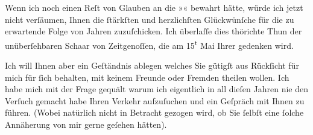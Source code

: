 \pstart
           Wenn ich noch einen Reſt von Glauben an die »\label{K_L03887-1v}\label{K_L03887-1}« bewahrt hätte, würde ich jetzt nicht verſäumen, Ihnen die{ }ſtärkſten und herzlichſten Glückwünſche für die zu erwartende Folge von Jahren
               zuzuſchicken. Ich überlaſſe dies thörichte Thun der unüberſehbaren Schaar von
               Zeitgenoſſen, die am 15\textsuperscript{t} Mai Ihrer gedenken
               wird.\pend
           
\pstart
           Ich will Ihnen aber ein Geſtändnis ablegen welches Sie gütigſt aus Rückſicht für mich
               für{ }ſich behalten, mit keinem Freunde oder Fremden theilen wollen. Ich habe mich mit
               der Frage gequält warum ich eigentlich in all dieſen Jahren nie den Verſuch gemacht
               habe Ihren Verkehr aufzuſuchen und ein Geſpräch mit Ihnen zu führen. (Wobei natürlich
               nicht in Betracht gezogen wird, ob Sie{ }ſelbſt eine{ }ſolche Annäherung von mir gerne
               geſehen hätten).\pend
           

